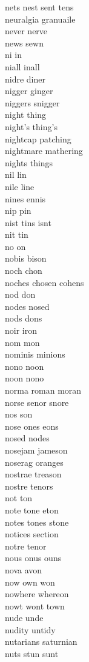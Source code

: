 nets nest sent tens\\
neuralgia granuaile\\
never nerve\\
news sewn\\
ni in\\
niall inall\\
nidre diner\\
nigger ginger\\
niggers snigger\\
night thing\\
night's thing's\\
nightcap patching\\
nightmare mathering\\
nights things\\
nil lin\\
nile line\\
nines ennis\\
nip pin\\
nist tins isnt\\
nit tin\\
no on\\
nobis bison\\
noch chon\\
noches chosen cohens\\
nod don\\
nodes nosed\\
nods dons\\
noir iron\\
nom mon\\
nominis minions\\
nono noon\\
noon nono\\
norma roman moran\\
norse senor snore\\
nos son\\
nose ones eons\\
nosed nodes\\
nosejam jameson\\
noserag oranges\\
nostrae treason\\
nostre tenors\\
not ton\\
note tone eton\\
notes tones stone\\
notices section\\
notre tenor\\
nous onus ouns\\
nova avon\\
now own won\\
nowhere whereon\\
nowt wont town\\
nude unde\\
nudity untidy\\
nutarians saturnian\\
nuts stun sunt\\

